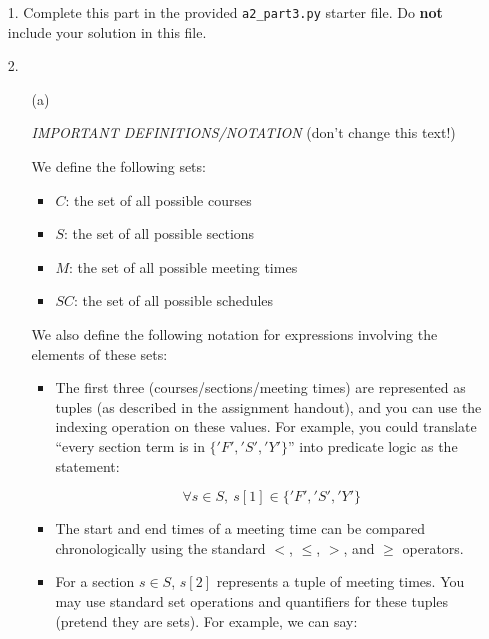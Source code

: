 \documentclass[fontsize=11pt]{article}
\begin{document}
\begin{enumerate}

    \item[1.]
        Complete this part in the provided \texttt{a2\_part3.py} starter file.
        Do \textbf{not} include your solution in this file.

    \item[2.]

        \begin{enumerate}
            \item[(a)]

                \emph{IMPORTANT DEFINITIONS/NOTATION} (don't change this text!)

                We define the following sets:

                \begin{itemize}
                    \item $C$: the set of all possible courses
                    \item $S$: the set of all possible sections
                    \item $M$: the set of all possible meeting times
                    \item $SC$: the set of all possible schedules
                \end{itemize}

                We also define the following notation for expressions involving the elements of these sets:

                \begin{itemize}
                    \item
                          The first three (courses/sections/meeting times) are represented as tuples (as described in the assignment handout), and you can use the indexing operation on these values. For example, you could translate ``every section term is in $\{'F', 'S', 'Y'\}$'' into predicate logic as the statement:

                          \[\forall s \in S,~ s[1] \in \{'F', 'S', 'Y' \} \]

                    \item
                          The start and end times of a meeting time can be compared chronologically using the standard $<$, $\leq$, $>$, and $\geq$ operators.

                    \item
                          For a section $s \in S$, $s[2]$ represents a tuple of meeting times.
                          You may use standard set operations and quantifiers for these tuples (pretend they are sets).
                          For example, we can say:


\end{itemize}
\end{enumerate}
\end{enumerate}
\end{document}
